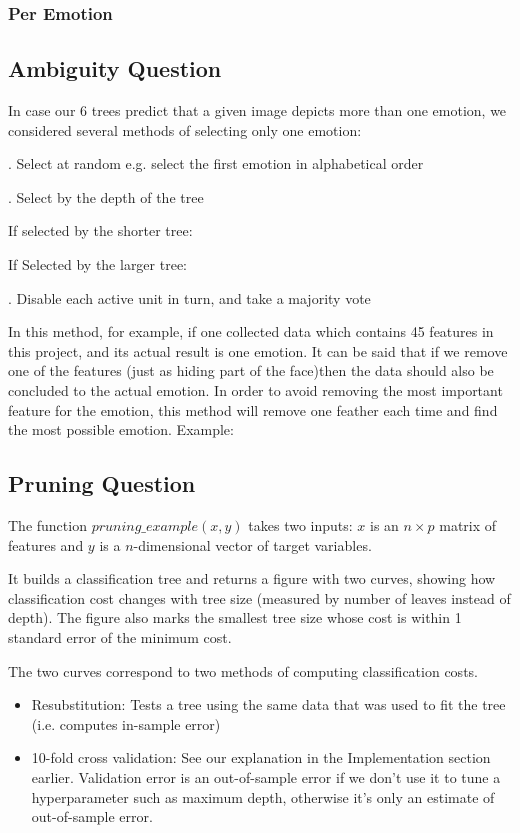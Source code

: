 \documentclass[12pt, a4paper]{article}
\begin{document}
\subsubsection*{Per Emotion}

\subsection*{Ambiguity Question}
In case our 6 trees predict that a given image depicts more than one emotion, we considered several methods of selecting only one emotion:\par
{}. Select at random e.g. select the first emotion in alphabetical order\par
{}. Select by the depth of the tree\par
If selected by the shorter tree:\par
If Selected by the larger tree:\par
{}. Disable each active unit in turn, and take a majority vote\par
In this method, for example, if one collected data which contains 45 features in this project, and its actual result is one emotion. It can be said that if we remove one of the features (just as hiding part of the face)then the data should also be concluded to the actual emotion. In order to avoid removing the most important feature for the emotion, this method will remove one feather each time and find the most possible emotion.
Example:\par
\bigskip

\subsection*{Pruning Question}
The function $pruning\_example(x, y)$ takes two inputs: $x$ is an $n \times p$ matrix of features and $y$ is a $n$-dimensional vector of target variables.\par
\bigskip
It builds a classification tree and returns a figure with two curves, showing how classification cost changes with tree size (measured by number of leaves instead of depth). The figure also marks the smallest tree size whose cost is within 1 standard error of the minimum cost.\par
\bigskip
The two curves correspond to two methods of computing classification costs.
\begin{itemize}
    \item Resubstitution: Tests a tree using the same data that was used to fit the tree (i.e. computes in-sample error)
    \item 10-fold cross validation: See our explanation in the Implementation section earlier. Validation error is an out-of-sample error if we don't use it to tune a hyperparameter such as maximum depth, otherwise it's only an estimate of out-of-sample error.
\end{itemize}
\end{document}

